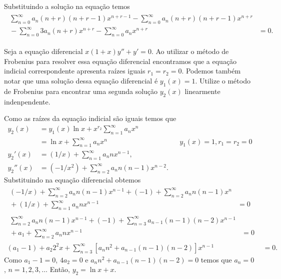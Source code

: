 \documentclass[a4paper,12pt, leqno, answers]{exam}
\begin{document}
\begin{questions}
\begin{solution}
        Substituindo a solu\c{c}\~{a}o na equa\c{c}\~{a}o temos
        \begin{align*}
            \begin{split}
                \sum_{n = 0}^\infty a_n \left( n + r \right) \left( n + r - 1 \right) x^{n + r - 1} - \sum_{n = 0}^\infty a_n \left( n + r \right) \left( n + r - 1 \right) x^{n + r} & \\ {}- \sum_{n = 0}^\infty 3 a_n \left( n + r \right) x^{n + r} - \sum_{n = 0}^\infty a_n x^{n + r} &= 0.
            \end{split}
        \end{align*}
    \end{solution}

    \question[P1 de 2011] Seja a equa\c{c}\~{a}o diferencial $x (1 + x) y'' + y' = 0$. Ao utilizar o m\'{e}todo de Frobenius para resolver essa equa\c{c}\~{a}o diferencial encontramos que a equa\c{c}\~{a}o indicial correspondente apresenta ra\'{i}zes iguais $r_1 = r_2 = 0$. Podemos tamb\'{e}m notar que uma solu\c{c}\~{a}o dessa equa\c{c}\~{a}o diferencial \'{e} $y_1(x) = 1$. Utilize o m\'{e}todo de Frobenius para encontrar uma segunda solu\c{c}\~{a}o $y_2(x)$ linearmente indenpendente.
    \begin{solution}
        Como as ra\'{i}zes da equa\c{c}\~{a}o indicial s\~{a}o iguais temos que
        \begin{align*}
            y_2(x) &= y_1(x) \ln x + x^{r_2} \sum_{n = 1}^\infty a_n x^n \\
            &= \ln x + \sum_{n = 1}^\infty a_n x^n && y_1(x) = 1, r_1 = r_2 = 0 \\
            y_2'(x) &= (1/x) + \sum_{n = 1}^\infty a_n n x^{n - 1}, \\
            y_2''(x) &= (-1/x^2) + \sum_{n = 2}^\infty a_n n (n - 1) x^{n - 2}.
        \end{align*}
        Substituindo na equa\c{c}\~{a}o diferencial obtemos
        \begin{align*}
            \begin{split}
                (-1/x) + \sum_{n = 2}^\infty a_n n (n - 1) x^{n - 1} + (-1) + \sum_{n = 2}^\infty a_n n (n - 1) x^n & \\
                {}+ (1/x) + \sum_{n = 1}^\infty a_n n x^{n - 1} &= 0
            \end{split} \\
            \begin{split}
                \sum_{n = 2}^\infty a_n n (n - 1) x^{n - 1} + (-1) + \sum_{n = 3}^\infty a_{n - 1} (n - 1) (n - 2) x^{n - 1} & \\
                {}+ a_1 + \sum_{n = 2}^\infty a_n n x^{n - 1} &= 0
            \end{split} \\
            (a_1 - 1) + a_2 2^2 x + \sum_{n = 3}^\infty \left[ a_n n^2 + a_{n - 1} (n - 1) (n - 2) \right] x^{n - 1} &= 0.
        \end{align*}
        Como $a_1 - 1= 0$, $4 a_2 = 0$ e $a_n n^2 + a_{n - 1} (n - 1) (n - 2) = 0$ temos que $a_n = 0$, $n = 1, 2, 3, \ldots$ Ent\~{a}o, $y_2 = \ln x + x$.
    \end{solution}


\end{questions}
\end{document}
